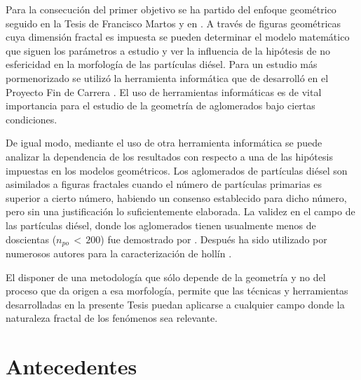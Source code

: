 \par Para la consecución del primer objetivo se ha partido del enfoque geométrico seguido en la Tesis de Francisco Martos \cite{martosphD:2006} y en \cite{lapuertaetal:2006,lapuertaetal:2010}. A través de figuras geométricas cuya dimensión fractal es impuesta se pueden determinar el modelo matemático que siguen los parámetros a estudio y ver la influencia de la hipótesis de no esfericidad en la morfología de las partículas diésel. Para un estudio más pormenorizado se utilizó la herramienta informática que de desarrolló en el Proyecto Fin de Carrera \cite{vieraPFC:2014}. El uso de herramientas informáticas es de vital importancia para el estudio de la geometría de aglomerados bajo ciertas condiciones.

\par De igual modo, mediante el uso de otra herramienta informática \cite{delblancoPFC:2015} se puede analizar la dependencia de los resultados con respecto a una de las hipótesis impuestas en los modelos geométricos. Los aglomerados de partículas diésel son asimilados a figuras fractales cuando el número de partículas primarias es superior a cierto número, habiendo un consenso establecido para dicho número, pero sin una justificación lo suficientemente elaborada. La validez en el campo de las partículas diésel, donde los aglomerados tienen usualmente menos de doscientas ($n_{po}\,<\,200$) fue demostrado por \cite{megaridisetal:1990}. Después ha sido utilizado por numerosos autores para la caracterización de hollín \cite{zhuetal:2003,leeetal:2002,caietal:1995,gorbunovetal:1999,zuritaetal:2002,parketal:2004}.

\par El disponer de una metodología que sólo depende de la geometría y no del proceso que da origen a esa morfología, permite que las técnicas y herramientas desarrolladas en la presente Tesis puedan aplicarse a cualquier campo donde la naturaleza fractal de los fenómenos sea relevante.

\section{Antecedentes}\label{sec:Antecedentes}


